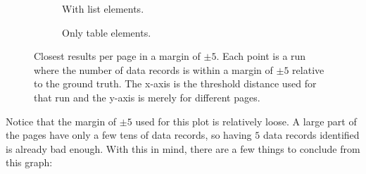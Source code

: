 \documentclass[10pt]{article}
\begin{document}
\begin{figure}[!b]
\begin{subfigure}[b]{.49\textwidth}
        \caption{With list elements.}
        \label{fig:results-with-list}
        
    \end{subfigure}
    \begin{subfigure}[b]{.49\textwidth}
        
        \caption{Only table elements.}
        \label{fig:results-without-list}
        
    \end{subfigure}
    
    \caption{Closest results per page in a margin of $\pm 5$. Each point is a run where the number of data records is within a margin of $\pm 5$ relative to the ground truth. The x-axis is the threshold distance used for that run and the y-axis is merely for different pages.}
    \label{fig:results-in-margin}
    
\end{figure}


Notice that the margin of $\pm 5$ used for this plot is relatively loose. A large part of the pages have only a few tens of data records, so having $5$ data records identified is already bad enough. With this in mind, there are a few things to conclude from this graph:
\end{document}
